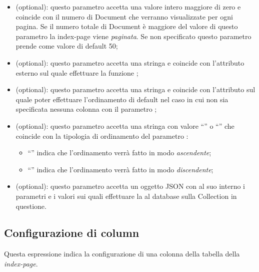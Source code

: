 \begin{itemize}

	\item \textbf{} (optional): questo parametro accetta una valore intero maggiore di zero e coincide con il numero di Document che verranno visualizzate per ogni pagina. Se il numero totale di Document è maggiore del valore di questo parametro la index-page viene \textit{paginata}. Se non specificato questo parametro prende come valore di default 50;
	\item \textbf{} (optional): questo parametro accetta una stringa e coincide con l'attributo esterno sul quale effettuare la funzione ;
	\item \textbf{} (optional): questo parametro accetta una stringa e coincide con l'attributo sul quale poter effettuare l'ordinamento di default nel caso in cui non sia specificata nessuna colonna con il parametro ;
	\item \textbf{} (optional): questo parametro accetta una stringa con valore ``'' o ``'' che coincide con la tipologia di ordinamento del parametro :
	\begin{itemize}

		\item ``'' indica che l'ordinamento verrà fatto in modo \textit{ascendente};
		\item ``'' indica che l'ordinamento verrà fatto in modo \textit{discendente};	
	
	\end{itemize}
	\item \textbf{} (optional): questo parametro accetta un oggetto JSON con al suo interno i parametri e i valori sui quali effettuare la  al database sulla Collection in questione.
\end{itemize}

\subsection{Configurazione di column}

Questa espressione indica la configurazione di una colonna della tabella della \textit{index-page}.

